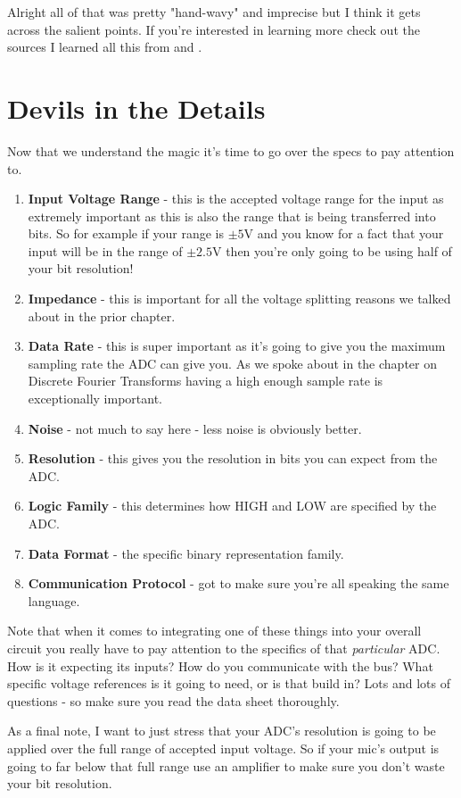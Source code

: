 \documentclass[12pt,a6paper]{book}
\begin{document}
Alright all of that was pretty "hand-wavy" and imprecise but I think it gets across the salient points. If you're interested in learning more check out the sources I learned all this from \cite{fzigunov} and \cite{tinstruments}. 

\section{Devils in the Details}
Now that we understand the magic it's time to go over the specs to pay attention to. 

\begin{enumerate}
\item \textbf{Input Voltage Range} - this is the accepted voltage range for the input as extremely important as this is also the range that is being transferred into bits. So for example if your range is $\pm5$V and you know for a fact that your input will be in the range of $\pm2.5$V then you're only going to be using half of your bit resolution! 
\item \textbf{Impedance} - this is important for all the voltage splitting reasons we talked about in the prior chapter. 
\item \textbf{Data Rate} - this is super important as it's going to give you the maximum sampling rate the ADC can give you. As we spoke about in the chapter on Discrete Fourier Transforms having a high enough sample rate is exceptionally important.
\item \textbf{Noise} - not much to say here - less noise is obviously better.
\item \textbf{Resolution} - this gives you the resolution in bits you can expect from the ADC.
\item \textbf{Logic Family} - this determines how HIGH and LOW are specified by the ADC.
\item \textbf{Data Format} - the specific binary representation family.
\item \textbf{Communication Protocol} - got to make sure you're all speaking the same language.
\end{enumerate}

Note that when it comes to integrating one of these things into your overall circuit you really have to pay attention to the specifics of that \textit{particular} ADC. How is it expecting its inputs? How do you communicate with the bus? What specific voltage references is it going to need, or is that build in? Lots and lots of questions - so make sure you read the data sheet thoroughly. 

As a final note, I want to just stress that your ADC's resolution is going to be applied over the full range of accepted input voltage. So if your mic's output is going to far below that full range use an amplifier to make sure you don't waste your bit resolution. 

\newpage



\end{document}
